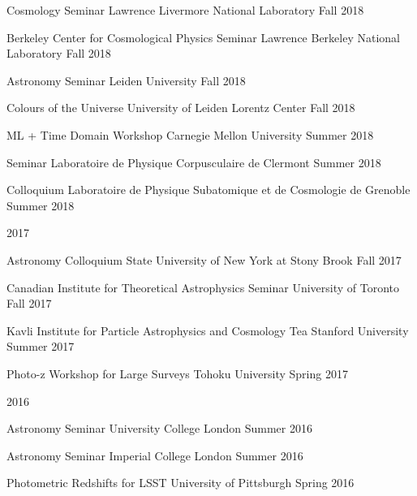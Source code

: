 \documentclass[11pt,letterpaper]{article}
\begin{document}
\begin{list}{}{\malzlist}
\begin{list}{}{\malzlist}
  {Cosmology Seminar}
	{Lawrence Livermore National Laboratory}
	{Fall 2018}
\item {}
  {Berkeley Center for Cosmological Physics Seminar}
	{Lawrence Berkeley National Laboratory}
	{Fall 2018}
\item {}
  {Astronomy Seminar}
	{Leiden University}
	{Fall 2018}
\item {}
	{Colours of the Universe}
	{University of Leiden Lorentz Center}
	{Fall 2018}
\item {}
  {ML + Time Domain Workshop}
	{Carnegie Mellon University}
	{Summer 2018}
\item {}
  {Seminar}
	{Laboratoire de Physique Corpusculaire de Clermont}
	{Summer 2018}
\item {}
  {Colloquium}
	{Laboratoire de Physique Subatomique et de Cosmologie de Grenoble}
	{Summer 2018}
\end{list}
\item 2017
\nopagebreak\begin{list}{}{\malzlist}
\item {}
  {Astronomy Colloquium}
	{State University of New York at Stony Brook}
	{Fall 2017}
\item {}
  {Canadian Institute for Theoretical Astrophysics Seminar}
	{University of Toronto}
	{Fall 2017}
\item {}
  {Kavli Institute for Particle Astrophysics and Cosmology Tea}
	{Stanford University}
	{Summer 2017}
\item {}
  {Photo-z Workshop for Large Surveys}
	{Tohoku University}
	{Spring 2017}
\end{list}
\item 2016
\nopagebreak\begin{list}{}{\malzlist}
\item {}
  {Astronomy Seminar}
	{University College London}
	{Summer 2016}
\item {}
  {Astronomy Seminar}
	{Imperial College London}
	{Summer 2016}
\item {}
  {Photometric Redshifts for LSST}
	{University of Pittsburgh}
	{Spring 2016}
\end{list}
\end{list}
\end{document}
